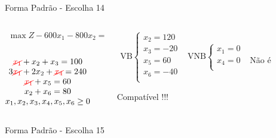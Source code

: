 \documentclass{beamer}
\begin{document}
\begin{frame}
{\begin{block}{Forma Padrão - {\color{cyan}Escolha 14}}
			\begin{columns}
				\begin{column}{0.35\textwidth}
					$
						\begin{matrix}
							\max Z - 600x_1 - 800x_2 = 0 \\
						\end{matrix}
					$ \\
					 \\
					$
						\begin{matrix}
							{\color{red}\cancel{x_1}}  + x_2  + x_3                   = 100 \\
							3{\color{red}\cancel{x_1}} + 2x_2       + {\color{red}\cancel{x_4}}             = 240 \\
							{\color{red}\cancel{x_1}}                     + x_5       = 60 \\
							x_2                           + x_6 = 80 \\
							x_1,x_2, x_3, x_4, x_5, x_6 \ge 0 \\
						\end{matrix}
					$
				\end{column}
				\vline
				\hspace{0.1cm}
				\begin{column}{0.45\textwidth}
						$
							\begin{matrix}
								\text{VB} \left\{  \begin{matrix}
																 x_2 = 120 \\
																 x_3 = -20 \\
																 x_5 = 60 \\
																 x_6 = -40 \\
												   \end{matrix} 
										   \right.
								&
								\text{VNB} \left\{  \begin{matrix}
																 x_1 = 0 \\
																 x_4 = 0 \\
												   \end{matrix} 
										   \right. 
								\\
							 & \\
							\end{matrix}
						$
						{\color{red}Não é Compatível !!!}
				\end{column}
			\end{columns}
		\end{block}
	}
	{
		\begin{block}{Forma Padrão - {\color{cyan}Escolha 15}}

\end{block}}
\end{frame}
\end{document}
